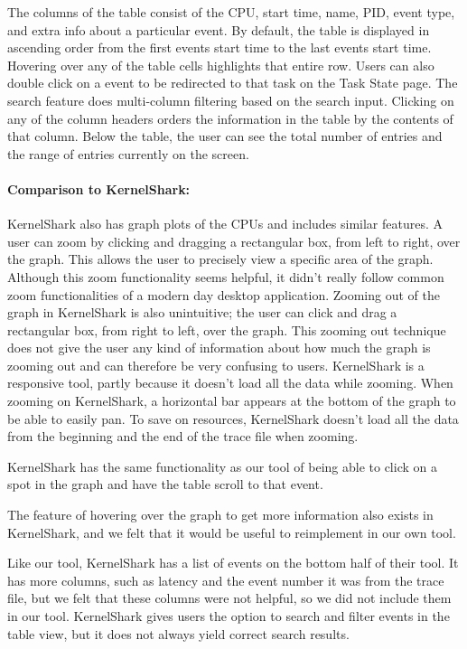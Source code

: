 \documentclass{hmcclinic}
\begin{document}
The columns of the table consist of the CPU, start time, name, PID, event type,
and extra info about a particular event. By default, the table is displayed in
ascending order from the first events start time to the last events start time.
Hovering over any of the table cells highlights that entire row. Users can also
double click on a event to be redirected to that task on the Task State page.
The search feature does multi-column filtering based on the search input.
Clicking on any of the column headers orders the information in the table by the
contents of that column. Below the table, the user can see the total number of
entries and the range of entries currently on the screen.

\paragraph{Comparison to KernelShark:} 
  KernelShark also has graph plots of the CPUs and includes similar features. A
  user can zoom by clicking and dragging a rectangular box, from left to right,
  over the graph.  This allows the user to precisely view a specific area of the
  graph.  Although this zoom functionality seems helpful, it didn't really follow
  common zoom functionalities of a modern day desktop application. Zooming out of
  the graph in KernelShark is also unintuitive; the user can click and drag a
  rectangular box, from right to left, over the graph. This zooming out technique
  does not give the user any kind of information about how much the graph is
  zooming out and can therefore be very confusing to users. KernelShark is a
  responsive tool, partly because it doesn't load all the data while zooming. When
  zooming on KernelShark, a horizontal bar appears at the bottom of the graph to
  be able to easily pan. To save on resources, KernelShark doesn't load all the
  data from the beginning and the end of the trace file when zooming. 
    
  KernelShark has the same functionality as our tool of being able to click on a
  spot in the graph and have the table scroll to that event. 
    
  The feature of hovering over the graph to get more information also exists in
  KernelShark, and we felt that it would be useful to reimplement in our own
  tool.

  Like our tool, KernelShark has a list of events on the bottom half of
  their tool.  It has more columns, such as latency and the event number it was
  from the trace file, but we felt that these columns were not helpful, so we
  did not include them in our tool. KernelShark gives users the option to search
  and filter events in the table view, but it does not always yield correct
  search results. 
\end{document}
